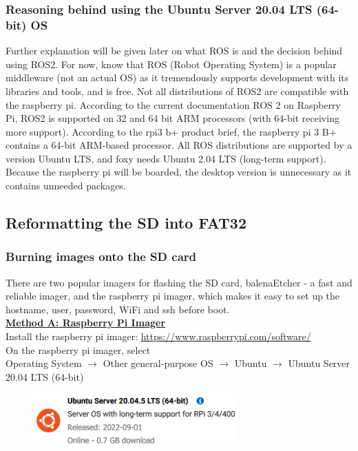 \documentclass[a4paper, 10pt]{article}
\begin{document}
        \subsubsection{Reasoning behind using the Ubuntu Server 20.04 LTS (64-bit) OS}
            Further explanation will be given later on what ROS is and the decision behind using ROS2. For now, know that ROS (Robot Operating System) is a popular middleware (not an actual OS) as it tremendously supports development with its libraries and tools, and is free.
            Not all distributions of ROS2 are compatible with the raspberry pi. According to the current documentation ROS 2 on Raspberry Pi, ROS2 is supported on 32 and 64 bit ARM processors (with 64-bit receiving more support). According to the rpi3 b+ product brief, the raspberry pi 3 B+ contains a 64-bit ARM-based processor.
            All ROS distributions are supported by a version Ubuntu LTS, and foxy needs Ubuntu 2.04 LTS (long-term support). Because the raspberry pi will be boarded, the desktop version is unnecessary as it contains unneeded packages. 

        \subsection{Reformatting the SD into FAT32}
        
        \subsubsection{Burning images onto the SD card}
            There are two popular imagers for flashing the SD card, balenaEtcher - a fast and reliable imager, and the raspberry pi imager, which makes it easy to set up the hostname, user, password, WiFi and ssh before boot. \\

        \underline{\textbf{Method A: Raspberry Pi Imager}}\\
        Install the raspberry pi imager: \url{https://www.raspberrypi.com/software/}\\
        
        On the raspberry pi imager, select\\
        Operating System $\rightarrow$ Other general-purpose OS  $\rightarrow$ Ubuntu $\rightarrow$ Ubuntu Server 20.04 LTS (64-bit) 
        
       \begin{figure}[h]
            \centering
            \includegraphics[width=0.7\textwidth]{media/ubuntu_rp_imager.png}
            \label{fig:rp-ubuntu-server}
        \end{figure}
    
\end{document}
